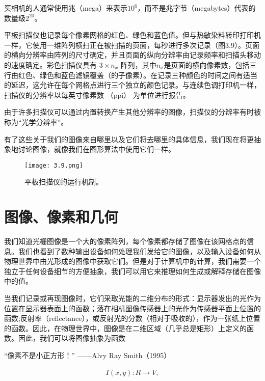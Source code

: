 \documentclass[lang=cn,12pt]{elegantbook}
\begin{document}
\begin{note}
买相机的人通常使用兆（mega）来表示$10^6$，而不是兆字节（megabytes）代表的数量级$2^{20}$。
\end{note}

平板扫描仪也记录每个像素网格的红色、绿色和蓝色值。但与热敏染料转印打印机一样，它使用一维阵列横扫正在被扫描的页面，每秒进行多次记录（图3.9）。页面的横向分辨率由阵列的尺寸确定，并且页面的纵向分辨率由记录频率和扫描头移动的速度确定。彩色扫描仪具有 $3\times n_x$ 阵列，其中$n_x$是页面的横向像素数，包括三行由红色、绿色和蓝色滤镜覆盖（的子像素）。在记录三种颜色的时间之间有适当的延迟，这允许在每个网格点进行三个独立的颜色记录。与连续色调打印机一样，扫描仪的分辨率以每英寸像素数 （ppi） 为单位进行报告。

\begin{note}
由于许多扫描仪可以通过内置转换产生其他分辨率的图像，扫描仪的分辨率有时被称为“光学分辨率”。
\end{note}

有了这些关于我们的图像来自哪里以及它们将去哪里的具体信息，我们现在将更抽象地讨论图像，就像我们在图形算法中使用它们一样。

\begin{figure}[htb]
  \centering
  \texttt{[image: 3.9.png]}
  \caption{平板扫描仪的运行机制。}
\end{figure}

\section{图像、像素和几何}

我们知道光栅图像是一个大的像素阵列，每个像素都存储了图像在该网格点的信息。我们也看到了数种输出设备如何处理我们发给它的图像，以及输入设备如何从物理世界中由光形成的图像中获取它们。但是对于计算机中的计算，我们需要一个独立于任何设备细节的方便抽象，我们可以用它来推理如何生成或解释存储在图像中的值。

当我们记录或再现图像时，它们采取光能的二维分布的形式：显示器发出的光作为位置在显示器表面上的函数；落在相机图像传感器上的光作为传感器平面上位置的函数;反射率（reflectance），或反射光的分数（相对于吸收的），作为一张纸上位置的函数。因此，在物理世界中，图像是在二维区域（几乎总是矩形）上定义的函数。因此，我们可以将图像抽象为函数

\begin{note}
“像素不是小正方形！”  ——Alvy Ray Smith（1995）
\end{note}


\[
  \begin{aligned}
  I(x,y):R\rightarrow V,
  \end{aligned}
\]
\end{document}
